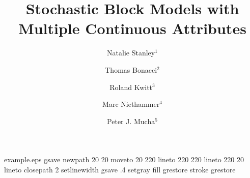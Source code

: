 %
%
%
%
%
\begin{filecontents*}{example.eps}
gsave
newpath
  20 20 moveto
  20 220 lineto
  220 220 lineto
  220 20 lineto
closepath
2 setlinewidth
gsave
  .4 setgray fill
grestore
stroke
grestore
\end{filecontents*}
%
\RequirePackage{fix-cm}
%
\documentclass[smallextended]{svjour3}       %
%
\smartqed  %
%
\usepackage{graphicx}
\usepackage{amsmath}
\usepackage{hyperref}
%
%
%
%
%


\title{Stochastic Block Models with Multiple Continuous Attributes%
}


\author{Natalie Stanley$^{1}$         \and
        Thomas Bonacci$^{2}$ \and 
        Roland Kwitt$^{3}$ \and
        Marc Niethammer$^{4}$ \and
        Peter J. Mucha$^{5}$
}

